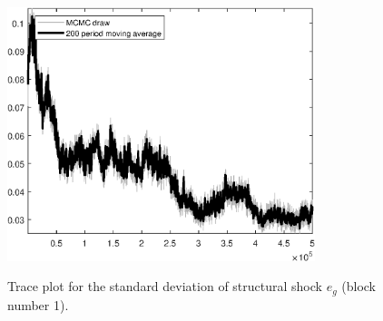 \begin{figure}[H]
\centering
  \includegraphics[width=0.8\textwidth]{BRS_growth_ext_shopping/graphs/TracePlot_SE_e_g_blck_1}\\
    \caption{Trace plot for the standard deviation of structural shock ${e_g}$ (block number 1).}
\end{figure}
